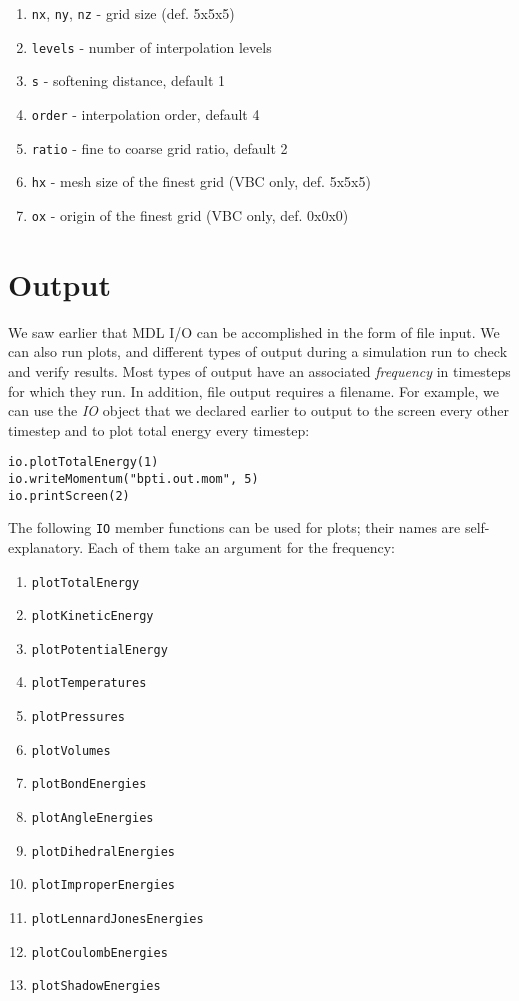 \documentclass[11pt]{report}
\begin{document}
\begin{enumerate}
\begin{enumerate}
\item \texttt{nx}, \texttt{ny}, \texttt{nz} - grid size (def. 5x5x5)
\item \texttt{levels} - number of interpolation levels
\item \texttt{s} - softening distance, default 1
\item \texttt{order} - interpolation order, default 4
\item \texttt{ratio} - fine to coarse grid ratio, default 2
\item \texttt{hx} - mesh size of the finest grid (VBC only, def. 5x5x5)
\item \texttt{ox} - origin of the finest grid (VBC only, def. 0x0x0)
\end{enumerate}
\end{enumerate}



\section{Output}

We saw earlier that MDL I/O can be accomplished in the form
of file input.  We can also run plots, and different types of output
during a simulation run to check and verify results.  Most types
of output have an associated {\it frequency} in timesteps
for which they run.  In addition, file output requires
a filename.  For example, we can use the {\it IO}
object that we declared earlier to output to the screen
every other timestep and to plot total energy every timestep:

\begin{verbatim}
io.plotTotalEnergy(1)
io.writeMomentum("bpti.out.mom", 5)
io.printScreen(2)
\end{verbatim}

The following \texttt{IO} member functions can be used
for plots; their names are self-explanatory.  Each of them
take an argument for the frequency:

\begin{enumerate}
\item \texttt{plotTotalEnergy}
\item \texttt{plotKineticEnergy}
\item \texttt{plotPotentialEnergy}
\item \texttt{plotTemperatures}
\item \texttt{plotPressures}
\item \texttt{plotVolumes}
\item \texttt{plotBondEnergies}
\item \texttt{plotAngleEnergies}
\item \texttt{plotDihedralEnergies}
\item \texttt{plotImproperEnergies}
\item \texttt{plotLennardJonesEnergies}
\item \texttt{plotCoulombEnergies}
\item \texttt{plotShadowEnergies}
\end{enumerate}
\end{document}
